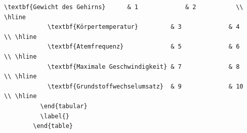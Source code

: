 \documentclass["WS\space 16-17\space -\space LaTeX-Kurs\space -\space Praesentation\space -\space 2.tex"]{subfiles}
\begin{document}
\begin{frame}[fragile]
\begin{lstlisting}[gobble=8]
            \textbf{Gewicht des Gehirns}      & 1             & 2           \\ \hline 
            \textbf{Körpertemperatur}         & 3             & 4           \\ \hline 
            \textbf{Atemfrequenz}             & 5             & 6           \\ \hline 
            \textbf{Maximale Geschwindigkeit} & 7             & 8           \\ \hline 
            \textbf{Grundstoffwechselumsatz}  & 9             & 10          \\ \hline
          \end{tabular} 
          \label{}
        \end{table}
	\end{lstlisting}
\end{frame}
\end{document}
